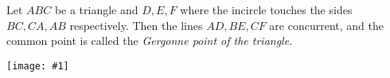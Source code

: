 \documentclass[12pt]{article}
\newcommand{\figura}[1]{\begin{center}\texttt{[image: \#1]}\end{center}}
\begin{document}
Let $ABC$ be a triangle and $D,E,F$ where the incircle touches the sides $BC,CA,AB$ respectively. Then the lines $AD, BE, CF$ are concurrent, and the common point is called the \emph{Gergonne point of the triangle}.
\figura{gergonne}
\end{document}
